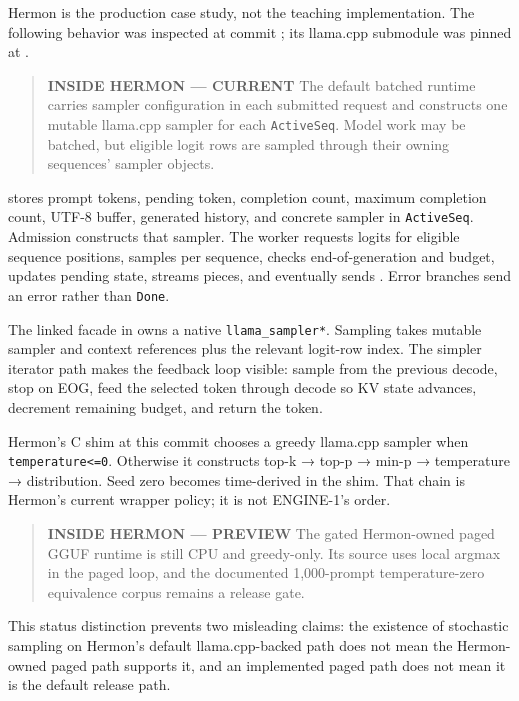\documentclass[
  10pt,
]{article}
\begin{document}
Hermon is the production case study, not the teaching implementation.
The following behavior was inspected at commit
\texttt{}; its
llama.cpp submodule was pinned at
\texttt{}.

\begin{quote}
\textbf{INSIDE HERMON --- CURRENT} The default batched runtime carries
sampler configuration in each submitted request and constructs one
mutable llama.cpp sampler for each \texttt{ActiveSeq}. Model work may be
batched, but eligible logit rows are sampled through their owning
sequences' sampler objects.
\end{quote}

\texttt{} stores prompt
tokens, pending token, completion count, maximum completion count, UTF-8
buffer, generated history, and concrete sampler in \texttt{ActiveSeq}.
Admission constructs that sampler. The worker requests logits for
eligible sequence positions, samples per sequence, checks
end-of-generation and budget, updates pending state, streams pieces, and
eventually sends \texttt{}.
Error branches send an error rather than \texttt{Done}.

The linked facade in
\texttt{} owns a native
\texttt{llama\_sampler*}. Sampling takes mutable sampler and context
references plus the relevant logit-row index. The simpler iterator path
makes the feedback loop visible: sample from the previous decode, stop
on EOG, feed the selected token through decode so KV state advances,
decrement remaining budget, and return the token.

Hermon's C shim at this commit chooses a greedy llama.cpp sampler when
\texttt{temperature\textless{}=0}. Otherwise it constructs top-k → top-p
→ min-p → temperature → distribution. Seed zero becomes time-derived in
the shim. That chain is Hermon's current wrapper policy; it is not
ENGINE-1's order.

\begin{quote}
\textbf{INSIDE HERMON --- PREVIEW} The gated Hermon-owned paged GGUF
runtime is still CPU and greedy-only. Its source uses local argmax in
the paged loop, and the documented 1,000-prompt temperature-zero
equivalence corpus remains a release gate.
\end{quote}

This status distinction prevents two misleading claims: the existence of
stochastic sampling on Hermon's default llama.cpp-backed path does not
mean the Hermon-owned paged path supports it, and an implemented paged
path does not mean it is the default release path.
\end{document}
